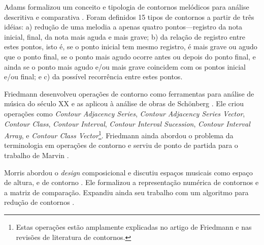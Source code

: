 \documentclass[12pt]{article}
\newcommand{\eng}[1]{\textit{#1}}
\begin{document}


Adams formalizou um conceito e tipologia de contornos melódicos para
análise descritiva e comparativa \cite{adams76:melodic}. Foram
definidos 15 tipos de contornos a partir de três idéias: a) redução de
uma melodia a apenas quatro pontos---registro da nota inicial, final,
da nota mais aguda e mais grave; b) da relação de registro entre estes
pontos, isto é, se o ponto inicial tem mesmo registro, é mais grave ou
agudo que o ponto final, se o ponto mais agudo ocorre antes ou depois
do ponto final, e ainda se o ponto mais agudo e/ou mais grave
coincidem com os pontos inicial e/ou final; e c) da possível
recorrência entre estes pontos.


Friedmann desenvolveu operações de contorno como ferramentas para
análise de música do século XX e as aplicou à análise de obras de
Schönberg \cite{friedmann85:methodology}. Ele criou operações como
\eng{Contour Adjacency Series}, \eng{Contour Adjacency Series Vector},
\eng{Contour Class}, \eng{Contour Interval}, \eng{Contour Interval
  Sucession}, \eng{Contour Interval Array}, e \eng{Contour Class
  Vector}\footnote{Estas operações estão amplamente explicadas no
  artigo de Friedmann e nas revisões de literatura de
  contornos.}. Friedmann ainda abordou o problema da terminologia em
operações de contorno \cite{friedmann87:response} e serviu de ponto de
partida para o trabalho de Marvin \cite{marvin88:generalized}.


Morris abordou o \eng{design} composicional e discutiu espaços
musicais como espaço de altura, e de contorno
\cite{morris87:composition}. Ele formalizou a representação numérica
de contornos e a matriz de comparação. Expandiu ainda seu trabalho com
um algoritmo para redução de contornos \cite{morris93:directions}.

\end{document}
